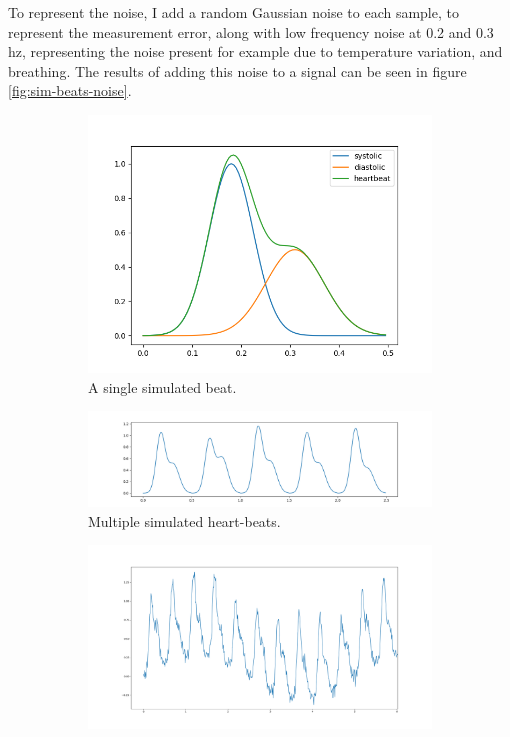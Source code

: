 \documentclass[12pt,a4paper,twoside,openany]{report}
\begin{document}
To represent the noise, I add a random Gaussian noise to each sample, to
represent the measurement error, along with low frequency noise at 0.2 and 0.3
hz, representing the noise present for example due to temperature variation,
and breathing.  
The results of adding this noise to a signal can be seen in figure
\ref{fig:sim-beats-noise}.

\begin{figure}
	\centering
	\begin{subfigure}[b]{0.4\textwidth}
		\centerline{\includegraphics[width=\textwidth]{figs/sim-beat.png}}
		\caption{A single simulated beat.}
		\label{fig:sim-beat}
	\end{subfigure}
	\hfill
	\begin{subfigure}[b]{0.5\textwidth}
		\centerline{\includegraphics[width=\textwidth]{figs/sim-beats.png}}
		\caption{Multiple simulated heart-beats.}
		\label{fig:sim-beats}
	\end{subfigure}
	\hfill
	\begin{subfigure}[b]{0.6\textwidth}
		\centerline{\includegraphics[width=\textwidth]{figs/sim-beats-with-noise.png}}

\end{subfigure}
\end{figure}
\end{document}

